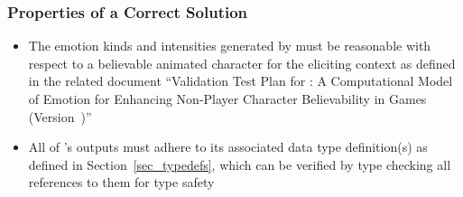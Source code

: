 \subsubsection{Properties of a Correct Solution} \label{sec_CorrectSolution}
\begin{itemize}

    \item The emotion kinds and intensities generated by \progname{} must be
    reasonable with respect to a believable animated character for the
    eliciting context as defined in the related document ``Validation Test Plan
    for \progname{}: A Computational Model of Emotion for Enhancing Non-Player
    Character Believability in Games (Version~\validatetestplanVersion)''

    \item All of \progname{}'s outputs must adhere to its associated data type
    definition(s) as defined in Section~\ref{sec_typedefs}, which can be
    verified by type checking all references to them for type safety

\end{itemize}